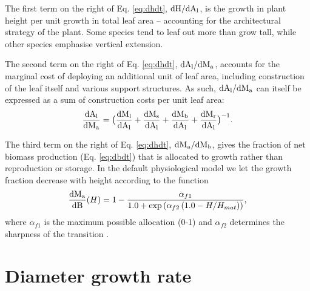 \documentclass[10pt,twoside]{article}
\begin{document}
The first term on the right of Eq. \ref{eq:dhdt},
\(\rm{d}H / \rm{d}A_\textrm{l}\), is the growth in plant height
per unit growth in total leaf area -- accounting for the architectural
strategy of the plant. Some species tend to leaf out more than grow
tall, while other species emphasise vertical extension.

The second term on the right of Eq. \ref{eq:dhdt},
\(\rm{d}A_\textrm{l} / \rm{d}M_\textrm{a}\), accounts for the
marginal cost of deploying an additional unit of leaf area, including
construction of the leaf itself and various support structures. As such,
\(\rm{d}A_\textrm{l} / \rm{d}M_\textrm{a}\) can itself be
expressed as a sum of construction costs per unit leaf area:
\begin{equation}\label{eq:daldmt}
\frac{\rm{d}A_\textrm{l}}{\rm{d}M_\textrm{a}}
= \big( \frac{\rm{d}M_\textrm{l}}{\rm{d}A_\textrm{l}} + \frac{\rm{d}M_\textrm{s}}{\rm{d}A_\textrm{l}} + \frac{\rm{d}M_\textrm{b}}{\rm{d}A_\textrm{l}} + \frac{\rm{d}M_\textrm{r}}{\rm{d}A_\textrm{l}}\big)^{-1}.
\end{equation}

The third term on the right of Eq. \ref{eq:dhdt},
\(\rm{d}M_\textrm{a} / \rm{d}M_\textrm{b}\), gives the fraction
of net biomass production (Eq. \ref{eq:dbdt}) that is allocated to
growth rather than reproduction or storage. In the default physiological model
we let the growth fraction decrease with height according to the function
\begin{equation}\label{eq:allocation}
\frac{\rm{d}M_\textrm{a}}{\rm{d}B}(H) = 1 -
 \frac{\alpha_{f1}} {1.0 + \exp\left(\alpha_{f2}  \left(1.0 - H / H_{mat}\right)\right)},
\end{equation}
where $\alpha_{f1}$ is the maximum possible allocation (0-1) and $\alpha_{f2}$
determines the sharpness of the transition \citep{Falster-2011}.

\section{Diameter growth rate}
\end{document}
